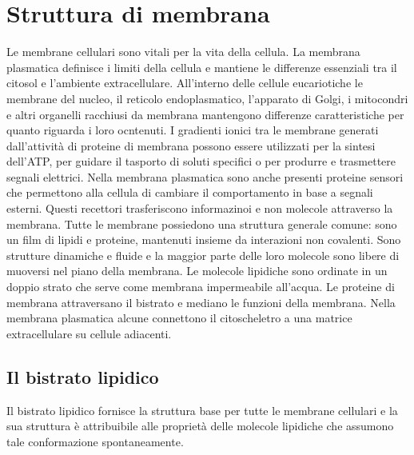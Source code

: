 \chapter{Struttura di membrana}
Le membrane cellulari sono vitali per la vita della cellula. La membrana plasmatica definisce i limiti della cellula e mantiene le differenze essenziali
tra il citosol e l'ambiente extracellulare. All'interno delle cellule eucariotiche le membrane del nucleo, il reticolo endoplasmatico, l'apparato di 
Golgi, i mitocondri e altri organelli racchiusi da membrana mantengono differenze caratteristiche per quanto riguarda i loro ocntenuti. I gradienti ionici
tra le membrane generati dall'attivit\`a di proteine di membrana possono essere utilizzati per la sintesi dell'ATP, per guidare il tasporto di soluti
specifici o per produrre e trasmettere segnali elettrici. Nella membrana plasmatica sono anche presenti proteine sensori che permettono alla cellula di 
cambiare il comportamento in base a segnali esterni. Questi recettori trasferiscono informazinoi e non molecole attraverso la membrana. Tutte le membrane
possiedono una struttura generale comune: sono un film di lipidi e proteine, mantenuti insieme da interazioni non covalenti. Sono strutture dinamiche e 
fluide e la maggior parte delle loro molecole sono libere di muoversi nel piano della membrana. Le molecole lipidiche sono ordinate in un doppio strato 
che serve come membrana impermeabile all'acqua. Le proteine di membrana attraversano il bistrato e mediano le funzioni della membrana. Nella membrana 
plasmatica alcune connettono il citoscheletro a una matrice extracellulare su cellule adiacenti. 
\section{Il bistrato lipidico}
Il bistrato lipidico fornisce la struttura base per tutte le membrane cellulari e la sua struttura \`e attribuibile alle propriet\`a delle molecole 
lipidiche che assumono tale conformazione spontaneamente. 
